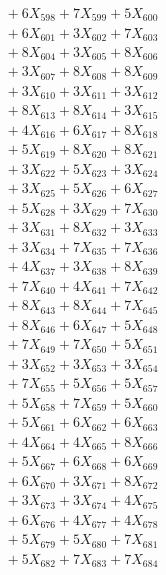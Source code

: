 \documentclass[a4paper,10pt]{article}
\begin{document}
{\begin{align}
&\;  + 6 X_{598} + 7 X_{599} + 5 X_{600} \\[0.3ex]
&\;  + 6 X_{601} + 3 X_{602} + 7 X_{603} \\[0.3ex]
&\;  + 8 X_{604} + 3 X_{605} + 8 X_{606} \\[0.3ex]
&\;  + 3 X_{607} + 8 X_{608} + 8 X_{609} \\[0.5ex]\allowbreak
&\;  + 3 X_{610} + 3 X_{611} + 3 X_{612} \\[0.3ex]
&\;  + 8 X_{613} + 8 X_{614} + 3 X_{615} \\[0.3ex]
&\;  + 4 X_{616} + 6 X_{617} + 8 X_{618} \\[0.3ex]
&\;  + 5 X_{619} + 8 X_{620} + 8 X_{621} \\[0.3ex]
&\;  + 3 X_{622} + 5 X_{623} + 3 X_{624} \\[0.3ex]
&\;  + 3 X_{625} + 5 X_{626} + 6 X_{627} \\[0.3ex]
&\;  + 5 X_{628} + 3 X_{629} + 7 X_{630} \\[0.3ex]
&\;  + 3 X_{631} + 8 X_{632} + 3 X_{633} \\[0.3ex]
&\;  + 3 X_{634} + 7 X_{635} + 7 X_{636} \\[0.3ex]
&\;  + 4 X_{637} + 3 X_{638} + 8 X_{639} \\[0.5ex]\allowbreak
&\;  + 7 X_{640} + 4 X_{641} + 7 X_{642} \\[0.3ex]
&\;  + 8 X_{643} + 8 X_{644} + 7 X_{645} \\[0.3ex]
&\;  + 8 X_{646} + 6 X_{647} + 5 X_{648} \\[0.3ex]
&\;  + 7 X_{649} + 7 X_{650} + 5 X_{651} \\[0.3ex]
&\;  + 3 X_{652} + 3 X_{653} + 3 X_{654} \\[0.3ex]
&\;  + 7 X_{655} + 5 X_{656} + 5 X_{657} \\[0.3ex]
&\;  + 5 X_{658} + 7 X_{659} + 5 X_{660} \\[0.3ex]
&\;  + 5 X_{661} + 6 X_{662} + 6 X_{663} \\[0.3ex]
&\;  + 4 X_{664} + 4 X_{665} + 8 X_{666} \\[0.3ex]
&\;  + 5 X_{667} + 6 X_{668} + 6 X_{669} \\[0.5ex]\allowbreak
&\;  + 6 X_{670} + 3 X_{671} + 8 X_{672} \\[0.3ex]
&\;  + 3 X_{673} + 3 X_{674} + 4 X_{675} \\[0.3ex]
&\;  + 6 X_{676} + 4 X_{677} + 4 X_{678} \\[0.3ex]
&\;  + 5 X_{679} + 5 X_{680} + 7 X_{681} \\[0.3ex]
&\;  + 5 X_{682} + 7 X_{683} + 7 X_{684} \\[0.3ex]

\end{align}}
\end{document}
